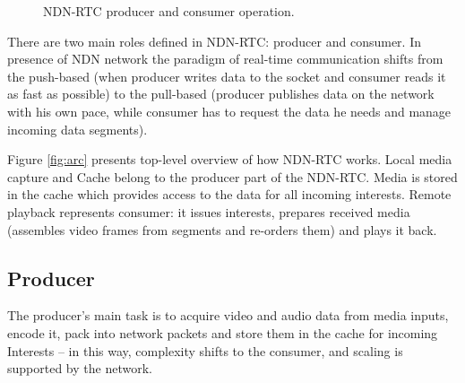 \documentclass{icn/sig-alternate-2012} %
\newcommand{\ndnrtcName}{NDN-RTC} %
\begin{document}
\begin{figure}[t!]
\centering
{}\qquad
{}
\caption{\ndnrtcName{} producer and consumer operation.}
\end{figure}



There are two main roles defined in \ndnrtcName{}: producer and consumer. In presence of NDN network the paradigm of real-time communication shifts from the push-based (when producer writes data to the socket and consumer reads it as fast as possible) to the pull-based (producer publishes data on the network with his own pace, while consumer has to request the data he needs and manage incoming data segments).

%

Figure \ref{fig:arc} presents top-level overview of how \ndnrtcName{} works. Local media capture and Cache belong to the producer part of the \ndnrtcName{}. Media is stored in the cache which provides access to the data for all incoming interests. Remote playback represents consumer: it issues interests, prepares received media (assembles video frames from segments and re-orders them) and plays it back.

\subsection{Producer}
The producer's main task is to acquire video and audio data from media inputs, encode it, pack into network packets and store them in the cache for incoming Interests – in this way, complexity shifts to the consumer, and scaling is supported by the network.
\end{document}
